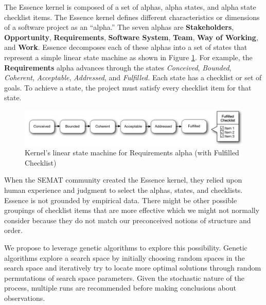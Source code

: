 \documentclass[3p,times,procedia]{elsarticle}
\begin{document}
The Essence kernel is composed of a set of alphas, alpha states, and alpha state checklist items. The Essence kernel defines different characteristics or dimensions of a software project as an ``alpha.'' The seven alphas are \textbf{Stakeholders}, \textbf{Opportunity}, \textbf{Requirements}, \textbf{Software System}, \textbf{Team}, \textbf{Way of Working}, and \textbf{Work}. Essence decomposes each of these alphas into a set of states that represent a simple linear state machine as shown in Figure \ref{StateMachine}. For example, the \textbf{Requirements} alpha advances through the states \textit{Conceived}, \textit{Bounded}, \textit{Coherent}, \textit{Acceptable}, \textit{Addressed}, and \textit{Fulfilled.} Each state has a checklist or set of goals. To achieve a state, the project must satisfy every checklist item for that state. \cite{OMGStandard} 
 
\begin{figure}[h]\vspace*{4pt}
\centerline{\includegraphics[width=5.4in]{kernel_images/StateMachineRequirements}}
\caption{Kernel's linear state machine for Requirements alpha (with Fulfilled Checklist)}\vspace*{-6pt}\label{StateMachine}
\end{figure}

When the SEMAT community created the Essence kernel, they relied upon human experience and judgment to select the alphas, states, and checklists. Essence is not grounded by empirical data. There might be other possible groupings of checklist items that are more effective which we might not normally consider because they do not match our preconceived notions of structure and order.

We propose to leverage genetic algorithms to explore this possibility. Genetic algorithms explore a search space by initially choosing random spaces in the search space and iteratively try to locate more optimal solutions through random permutations of search space parameters. Given the stochastic nature of the process, multiple runs are recommended before making conclusions about observations.
\end{document}
